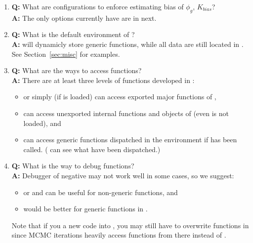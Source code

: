 \begin{enumerate}
\item {\bf\color{blue} Q:}
      What are configurations to enforce estimating bias of $\phi_g$,
      $K_{bias}$? \\
      {\bf\color{blue} A:}
      The only options currently  have are in next.

\item {\bf\color{blue} Q:}
      What is the default environment of ? \\
      {\bf\color{blue} A:}
       will dynamicly store generic functions, while
      all data are still located in .
      See Section~\ref{sec:misc} for examples.

\item {\bf\color{blue} Q:}
      What are the ways to access  functions? \\
      {\bf\color{blue} A:}
      There are at least three levels of functions developed in :
      \begin{itemize}
        \item {} or simply 
              (if  is loaded) can access exported major functions
              of ,
        \item {}
              can access unexported internal functions and objects
              of  (even  is not loaded), and
        \item {}
              can access generic functions dispatched in the environment
               if  has been called.
              ( can see what have been dispatched.)
      \end{itemize}

\item {\bf\color{blue} Q:}
      What is the way to debug  functions? \\
      {\bf\color{blue} A:}
      Debugger of negative  may not work well in some cases, so we
      suggest:
      \begin{itemize}
        \item {} or  and 
              can be useful for non-generic functions, and
        \item {} would be better for generic functions
              in .
      \end{itemize}
      Note that if you  a new code into , you
      may still have to overwrite functions in  since
      MCMC iterations heavily access functions from there instead of
      .

\end{enumerate}

